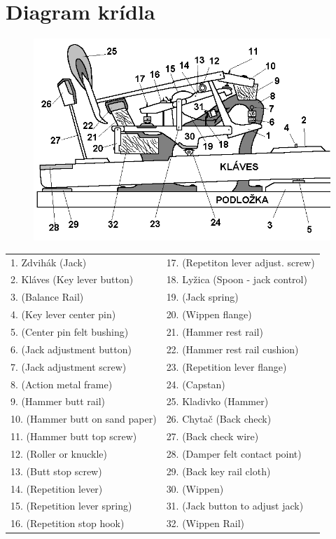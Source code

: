 \documentclass[11pt,a4paper]{book}
\begin{document}
\section{Diagram krídla}\label{s:grand-diagram}
\begin{figure}[ht]
\centering
\includegraphics[scale=0.4]{figures/GrandActionSK.png}
\end{figure}
\begin{longtable}[c]{@{}ll@{}}
\toprule
1. Zdvihák (Jack) & 17. (Repetiton lever adjust. screw)\tabularnewline
2. Kláves (Key lever button) & 18. Lyžica (Spoon - jack control)\tabularnewline
3. (Balance Rail) & 19. (Jack spring)\tabularnewline
4. (Key lever center pin) & 20. (Wippen flange)\tabularnewline
5. (Center pin felt bushing) & 21. (Hammer rest rail)\tabularnewline
6. (Jack adjustment button) & 22. (Hammer rest rail cushion)\tabularnewline
7. (Jack adjustment screw) & 23. (Repetition lever flange)\tabularnewline
8. (Action metal frame) & 24. (Capstan)\tabularnewline
9. (Hammer butt rail) & 25. Kladivko (Hammer)\tabularnewline
10. (Hammer butt on sand paper) & 26. Chytač (Back check)\tabularnewline
11. (Hammer butt top screw) & 27. (Back check wire)\tabularnewline
12. (Roller or knuckle) & 28. (Damper felt contact point)\tabularnewline
13. (Butt stop screw) & 29. (Back key rail cloth)\tabularnewline
14. (Repetition lever) & 30. (Wippen)\tabularnewline
15. (Repetition lever spring) & 31. (Jack button to adjust jack)\tabularnewline
16. (Repetition stop hook) & 32. (Wippen Rail)\tabularnewline
\bottomrule
\end{longtable}

%
%
\end{document}
